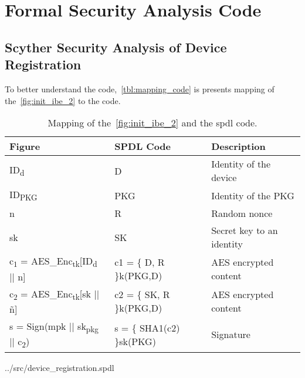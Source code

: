 \chapter{Formal Security Analysis Code}\label{apx:code}


\section{Scyther Security Analysis of Device Registration}\label{apx:scyther-analysis-dr}
To better understand the code,~\autoref{tbl:mapping_code} is presents mapping of the~\autoref{fig:init_ibe_2} to the code.

\begin{table}[h]
  \begin{tabular}{lll}
  Figure      				    & SPDL Code     			& Description 				\\ \hline
  ID\textsubscript{d}  		& D   						    & Identity of the device 	\\ %
  ID\textsubscript{PKG}   & PKG      					  & Identity of the PKG 		\\ %
  n      					        & R            				& Random nonce 				\\ %
  sk      					      & SK           				& Secret key to an identity	\\ %
  c\textsubscript{1} = AES\_Enc\textsubscript{tk}[ID\textsubscript{d} || n]  & c1 = \{ D, R \}k(PKG,D)   & AES encrypted content		\\ %
  c\textsubscript{2} = AES\_Enc\textsubscript{tk}[sk || \~{n}]     	& c2 = \{ SK, R \}k(PKG,D)	& AES encrypted content 	\\ %
  s = Sign(mpk || sk\textsubscript{pkg} || c\textsubscript{2})      & s = \{ SHA1(c2) \}sk(PKG)   & Signature				\\ %
  \end{tabular}
  \caption[SPDL mapping device registration]{Mapping of the~\autoref{fig:init_ibe_2} and the \gls{spdl} code.}
  \label{tbl:mapping_code}
\end{table}

\begin{lstinputlisting}
[language=Python, caption={Device Registration SPDL}]{../src/device_registration.spdl}
\end{lstinputlisting}

